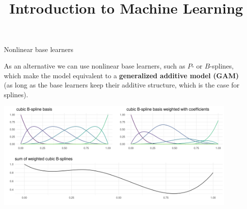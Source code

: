 \documentclass[11pt,compress,t,notes=noshow, xcolor=table]{beamer}
\title{Introduction to Machine Learning}
\begin{document}


\begin{vbframe}{Nonlinear base learners}

As an alternative we can use nonlinear base learners, such as $P$- or
$B$-splines, which make the model equivalent to a
\textbf{generalized additive model (GAM)} (as long as the base learners keep
their additive structure, which is the case for splines).
\vspace{0.5cm}

\vfill

\begin{center}
\includegraphics[width=0.9\textwidth]{figure/bspline-basis.png}
\end{center}

%

\end{vbframe}



\end{document}

